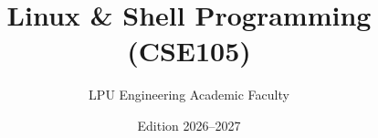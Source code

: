 \documentclass[a4paper,11pt,oneside,openany]{book}
\title{Linux \& Shell Programming (CSE105)}
\author{LPU Engineering Academic Faculty}
\date{Edition 2026--2027}
\begin{document}
\frontmatter

\makebookcover
\copyrightpage
\disclaimerpage

\tableofcontents
\newpage

\mainmatter












\end{document}
